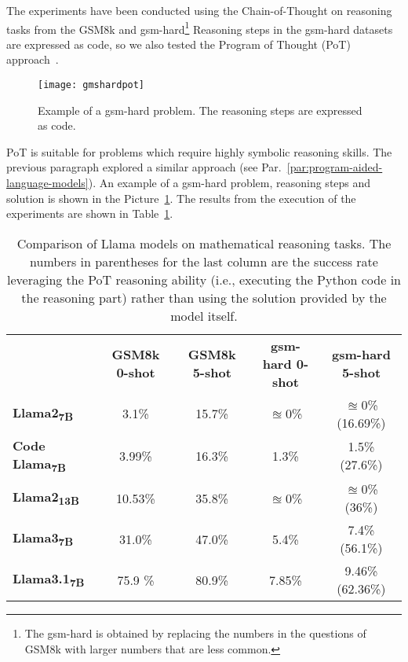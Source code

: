 The experiments have been conducted using the Chain-of-Thought on reasoning tasks from the GSM8k and gsm-hard\footnote{The gsm-hard is obtained by replacing the numbers in the questions of GSM8k with larger numbers that are less common.}
Reasoning steps in the gsm-hard datasets are expressed as code, so we also tested the Program of Thought (PoT) approach~\cite{chen2022program}.
\begin{figure}[h!]
	\centering
	\texttt{[image: gmshardpot]}
	\caption{Example of a gsm-hard problem. The reasoning steps are expressed as code.}
	\label{fig:pot-example}
\end{figure}
PoT is suitable for problems which require highly symbolic reasoning skills.
The previous paragraph explored a similar approach (see Par.~\ref{par:program-aided-language-models}).
An example of a gsm-hard problem, reasoning steps and solution is shown in the Picture~\ref{fig:pot-example}.
The results from the execution of the experiments are shown in Table~\ref{tab:llama-comparison}.

\begin{table}[h!]
	\centering
	\begin{tabularx}{\textwidth}{Xcccc}
		                                      & \textbf{GSM8k 0-shot} & \textbf{GSM8k 5-shot} & \textbf{gsm-hard 0-shot} & \textbf{gsm-hard 5-shot} \\
		\textbf{Llama2\textsubscript{7B}}     & 3.1\%                 & 15.7\%                & $\approxeq$0\%           & $\approxeq$0\% (16.69\%) \\
		\textbf{Code Llama\textsubscript{7B}} & 3.99\%                & 16.3\%                & 1.3\%                    & 1.5\% (27.6\%)           \\
		\textbf{Llama2\textsubscript{13B}}    & 10.53\%               & 35.8\%                & $\approxeq$0\%           & $\approxeq$0\%	 (36\%)   \\
		\textbf{Llama3\textsubscript{7B}}     & 31.0\%                & 47.0\%                & 5.4\%                    & 7.4\% (56.1\%)           \\
		\textbf{Llama3.1\textsubscript{7B}}   & 75.9 \%               & 80.9\%                & 7.85\%                   & 9.46\% (62.36\%)         \\
	\end{tabularx}
	\caption{Comparison of Llama models on mathematical reasoning tasks. The numbers in parentheses for the last column are the success rate leveraging the PoT reasoning ability (i.e., executing the Python code in the reasoning part) rather than using the solution provided by the model itself.}
	\label{tab:llama-comparison}
\end{table}

